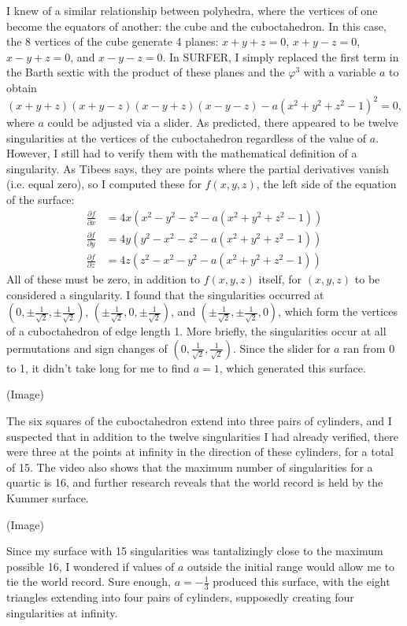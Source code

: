 \documentclass{article}
\begin{document}
I knew of a similar relationship between polyhedra,
where the vertices of one become the equators of another: the cube and the cuboctahedron.
In this case, the 8 vertices of the cube generate 4 planes:
$x+y+z=0$, $x+y-z=0$, $x-y+z=0$, and $x-y-z=0$.
In SURFER, I simply replaced the first term in the Barth sextic with the product of these planes
and the $\varphi^3$ with a variable $a$ to obtain
$$(x+y+z)(x+y-z)(x-y+z)(x-y-z)-a(x^2+y^2+z^2-1)^2=0,$$
where $a$ could be adjusted via a slider.
As predicted, there appeared to be twelve singularities at the vertices of the cuboctahedron
regardless of the value of $a$.
However, I still had to verify them with the mathematical definition of a singularity.
As Tibees says, they are points where the partial derivatives vanish (i.e. equal zero),
so I computed these for $f(x, y, z)$, the left side of the equation of the surface:
\begin{align*}
  \frac{\partial f}{\partial x} &= 4x(x^2-y^2-z^2-a(x^2+y^2+z^2-1)) \\
  \frac{\partial f}{\partial y} &= 4y(y^2-x^2-z^2-a(x^2+y^2+z^2-1)) \\
  \frac{\partial f}{\partial z} &= 4z(z^2-x^2-y^2-a(x^2+y^2+z^2-1))
\end{align*}
All of these must be zero, in addition to $f(x, y, z)$ itself,
for $(x, y, z)$ to be considered a singularity.
I found that the singularities occurred at
$\left(0, \pm\frac{1}{\sqrt{2}}, \pm\frac{1}{\sqrt{2}}\right)$,
$\left(\pm\frac{1}{\sqrt{2}}, 0, \pm\frac{1}{\sqrt{2}}\right)$, and
$\left(\pm\frac{1}{\sqrt{2}}, \pm\frac{1}{\sqrt{2}}, 0\right)$,
which form the vertices of a cuboctahedron of edge length 1.
More briefly, the singularities occur at all permutations and sign changes of
$\left(0, \frac{1}{\sqrt{2}}, \frac{1}{\sqrt{2}}\right)$.
Since the slider for $a$ ran from 0 to 1, it didn't take long for me to find $a=1$,
which generated this surface.

(Image)

The six squares of the cuboctahedron extend into three pairs of cylinders,
and I suspected that in addition to the twelve singularities I had already verified,
there were three at the points at infinity in the direction of these cylinders, for a total of 15.
The video also shows that the maximum number of singularities for a quartic is 16,
and further research reveals that the world record is held by the Kummer surface.

(Image)

Since my surface with 15 singularities was tantalizingly close to the maximum possible 16,
I wondered if values of $a$ outside the initial range would allow me to tie the world record.
Sure enough, $a=-\frac{1}{3}$ produced this surface,
with the eight triangles extending into four pairs of cylinders,
supposedly creating four singularities at infinity.
\end{document}
